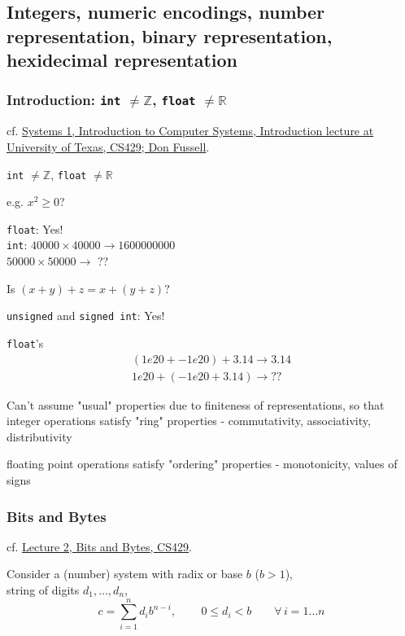 \documentclass[10pt]{amsart}
\begin{document}
\begin{multicols*}{2}
\part{Integers, numeric encodings, number representation, binary representation, hexidecimal representation}

\section{Introduction: \texttt{int} $\neq \mathbb{Z}$, \texttt{float} $\neq \mathbb{R}$}

cf. \href{https://www.cs.utexas.edu/users/fussell/courses/cs429h/lectures/Lecture_1-429h.pdf}{Systems 1, Introduction to Computer Systems, Introduction lecture at University of Texas, CS429; Don Fussell}.

\texttt{int} $\neq \mathbb{Z}$, \texttt{float} $\neq \mathbb{R}$

e.g. $x^2 \geq 0$? 

\texttt{float}: Yes!  \\
\texttt{int}: $40000 \times 40000 \to 1600000000$ \\
\phantom{int} $50000 \times 50000 \to $ ??

Is $(x+y) + z = x + (y +z)?$

\texttt{unsigned} and \texttt{signed int}: Yes!

\texttt{float}'s 
\[
\begin{gathered}
(1e20 + -1e20) + 3.14 \to 3.14 \\
1e20 + (-1e20 + 3.14) \to ??
\end{gathered}
\]

Can't assume "usual" properties due to finiteness of representations, so that integer operations satisfy "ring" properties
- commutativity, associativity, distributivity

floating point operations satisfy "ordering" properties
- monotonicity, values of signs


\section{Bits and Bytes}

cf. \href{https://www.cs.utexas.edu/users/fussell/courses/cs429h/lectures/Lecture_2-429h.pdf}{Lecture 2, Bits and Bytes, CS429}.

Consider a (number) system with radix or base $b$ ($b>1$), \\
string of digits $d_1, \dots , d_n$, \\
\begin{equation}
c = \sum_{i=1}^n d_i b^{n-i}, \qquad \, 0 \leq d_i < b \qquad \forall \, i = 1 \dots n 
\end{equation}


\end{multicols*}
\end{document}
